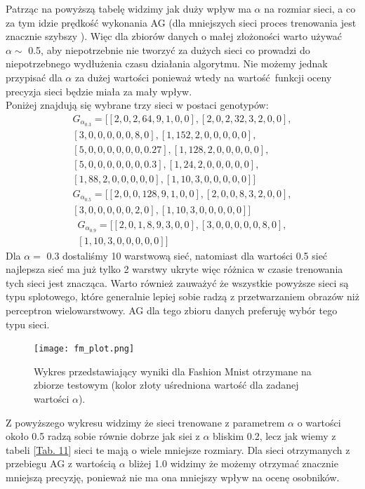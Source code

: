\documentclass{article}
\begin{document}
Patrząc na powyższą tabelę widzimy jak duży wpływ ma $\alpha$ na rozmiar sieci, a co
za tym idzie prędkość wykonania AG (dla mniejszych sieci proces trenowania jest znacznie szybszy
). Więc dla zbiorów danych o małej złożoności warto używać $\alpha \sim$ 0.5, aby niepotrzebnie
nie tworzyć za dużych sieci co prowadzi do niepotrzebnego wydłużenia czasu działania algorytmu.
Nie możemy jednak przypisać dla $\alpha$ za dużej wartości ponieważ wtedy na wartość funkcji
oceny precyzja sieci będzie miała za mały wpływ.\\
Poniżej znajdują się wybrane trzy sieci w postaci genotypów:
\begin{align*}
	G_{\alpha_{0.3}} = \big[[2, 0, 2, 64, 9, 1, 0, 0], [2, 0, 2, 32, 3, 2, 0, 0],\\
	                        [3, 0, 0, 0, 0, 0, 8, 0], [1, 152, 2, 0, 0, 0, 0, 0],\\
				[5, 0, 0, 0, 0, 0, 0, 0.27], [1, 128, 2, 0, 0, 0, 0, 0],\\
				[5, 0, 0, 0, 0, 0, 0, 0.3], [1, 24, 2, 0, 0, 0, 0, 0],\\
				[1, 88, 2, 0, 0, 0, 0, 0], [1, 10, 3, 0, 0, 0, 0, 0] \big]
\end{align*}
\begin{align*}
	G_{\alpha_{0.5}} = \big[[2, 0, 0, 128, 9, 1, 0, 0], [2, 0, 0, 8, 3, 2, 0, 0],\\
	                   [3, 0, 0, 0, 0, 0, 2, 0], [1, 10, 3, 0, 0, 0, 0, 0]\big]
\end{align*}
\begin{align*}
	 G_{\alpha_{0.9}} = \big[[2, 0, 1, 8, 9, 3, 0, 0], [3, 0, 0, 0, 0, 0, 8, 0],\\
	                         [1, 10, 3, 0, 0, 0, 0, 0]\big]
\end{align*}
Dla $\alpha = $ 0.3 dostaliśmy 10 warstwową sieć,  natomiast dla wartości 0.5 
sieć najlepsza sieć ma już tylko 2 warstwy ukryte więc różnica w czasie trenowania tych sieci
jest znacząca. Warto również zauważyć że wszystkie powyższe sieci są typu splotowego, które
generalnie lepiej sobie radzą z przetwarzaniem obrazów niż perceptron wielowarstwowy.
AG dla tego zbioru danych preferuję wybór tego typu sieci.
\begin{figure}[H]
\centering
\texttt{[image: fm\_plot.png]}
\caption{Wykres przedstawiający wyniki dla Fashion Mnist otrzymane na zbiorze testowym
(kolor złoty uśredniona wartość dla zadanej wartości $\alpha$).}
\end{figure}

Z powyższego wykresu widzimy że sieci trenowane z parametrem $\alpha$ o wartości około 0.5
radzą sobie równie dobrze jak siei z $\alpha$ bliskim 0.2, lecz jak wiemy z tabeli 
[\hyperref[tab:fmres]{Tab. 11}] sieci te mają o wiele mniejsze rozmiary. Dla sieci otrzymanych
z przebiegu AG z wartością $\alpha$ bliżej 1.0 widzimy że możemy otrzymać znacznie mniejszą
precyzję, ponieważ nie ma ona mniejszy wpływ na ocenę osobników.
\end{document}

